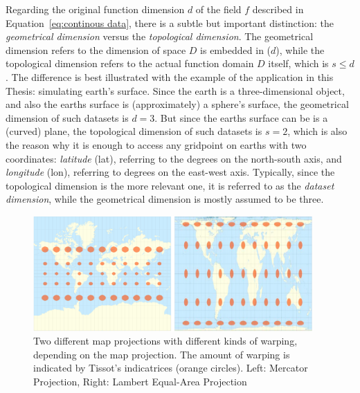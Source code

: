 Regarding the original function dimension $d$ of the field $f$ described in Equation~\ref{eq:continous data}, there is a subtle but important distinction: the \textit{geometrical dimension} versus the \textit{topological dimension}. 
The geometrical dimension refers to the dimension of space $D$ is embedded in ($d$), while the topological dimension refers to the actual function domain $D$ itself, which is $s\leq d$ \cite{telea2014data}.
The difference is best illustrated with the example of the application in this Thesis: simulating earth's surface. 
Since the earth is a three-dimensional object, and also the earths surface is (approximately) a sphere's surface, the geometrical dimension of such datasets is $d=3$. 
But since the earths surface can be is a (curved) plane, the topological dimension of such datasets is $s=2$, which is also the reason why it is enough to access any gridpoint on earths with two coordinates: \textit{latitude} (lat), referring to the degrees on the north-south axis, and \textit{longitude} (lon), referring to degrees on the east-west axis.
Typically, since the topological dimension is the more relevant one, it is referred to as the \textit{dataset dimension}, while the geometrical dimension is mostly assumed to be three. \cite{telea2014data}

\begin{figure}[htp]
  \begin{center}
    \includegraphics[width=0.95\textwidth]{figures/tissot-map-projections.png}
  \end{center}
  \caption{Two different map projections with different kinds of warping, depending on the map projection. The amount of warping is indicated by Tissot’s indicatrices (orange circles). Left: Mercator Projection, Right: Lambert Equal-Area Projection \cite{ghaderpour_map_2014}}\label{fig:tissot map projections}
\end{figure}


